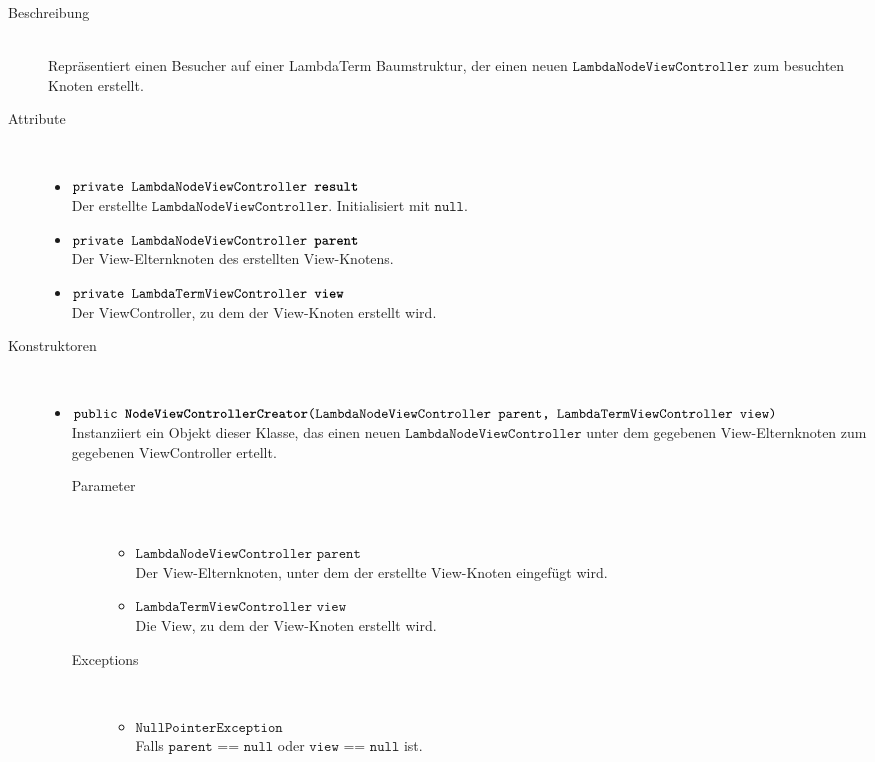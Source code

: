 \begin{description}
\item[Beschreibung] \hfill \\ Repräsentiert einen Besucher auf einer LambdaTerm Baumstruktur, der einen neuen $\texttt{LambdaNodeViewController}$ zum besuchten Knoten erstellt.

\item[Attribute] \hfill \\
	\vspace{-.8cm}
	\begin{itemize}
		\item $\texttt{private LambdaNodeViewController \textbf{result}}$ \\ Der erstellte $\texttt{LambdaNodeViewController}$. Initialisiert mit $\texttt{null}$.
		\item $\texttt{private LambdaNodeViewController \textbf{parent}}$ \\ Der View-Elternknoten des erstellten View-Knotens.
		\item $\texttt{private LambdaTermViewController \textbf{view}}$ \\ Der ViewController, zu dem der View-Knoten erstellt wird.
	\end{itemize}

\item[Konstruktoren] \hfill \\
	\vspace{-.8cm}
	\begin{itemize}
		\item $\texttt{public \textbf{NodeViewControllerCreator}(LambdaNodeViewController parent, LambdaTermViewController view)}$ \\ Instanziiert ein Objekt dieser Klasse, das einen neuen $\texttt{LambdaNodeViewController}$ unter dem gegebenen View-Elternknoten zum gegebenen ViewController ertellt.
		\begin{description}
			\item[Parameter] \hfill \\
			\vspace{-.8cm}
			\begin{itemize}
				\item $\texttt{LambdaNodeViewController parent}$ \\ Der View-Elternknoten, unter dem der erstellte View-Knoten eingefügt wird.
				\item $\texttt{LambdaTermViewController view}$ \\ Die View, zu dem der View-Knoten erstellt wird.
			\end{itemize}
			\item[Exceptions] \hfill \\
			\vspace{-.8cm}
			\begin{itemize}
				\item $\texttt{NullPointerException}$ \\ Falls $\texttt{parent == null}$ oder $\texttt{view == null}$ ist.
			\end{itemize}
		\end{description}
	\end{itemize}


\end{description}
